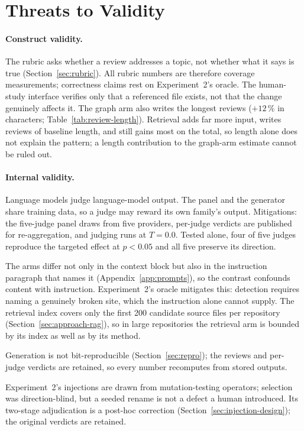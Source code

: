 \section{Threats to Validity}
\label{sec:threats}

\paragraph{Construct validity.}
The rubric asks whether a review addresses a topic, not whether what it says
is true (Section~\ref{sec:rubric}). All rubric numbers are therefore coverage
measurements; correctness claims rest on Experiment~2's oracle. The
human-study interface verifies only that a referenced file exists, not that
the change genuinely affects it. The graph arm also writes the longest
reviews ($+12\,\%$ in characters; Table~\ref{tab:review-length}).
Retrieval adds far more input, writes reviews of baseline length, and still
gains most on the total, so length alone does not explain the pattern; a
length contribution to the graph-arm estimate cannot be ruled out.

\paragraph{Internal validity.}
Language models judge language-model output. The panel and the generator share
training data, so a judge may reward its own family's output. Mitigations:
the five-judge panel draws from five providers, per-judge verdicts are
published for re-aggregation, and judging runs at $T = 0.0$. Tested alone,
four of five judges reproduce the targeted effect at $p < 0.05$ and all five
preserve its direction.

The arms differ not only in the context block but also in the instruction
paragraph that names it (Appendix~\ref{app:prompts}), so the contrast
confounds content with instruction. Experiment~2's oracle mitigates this:
detection requires naming a genuinely broken site, which the instruction
alone cannot supply. The retrieval index covers only the first 200
candidate source files per repository (Section~\ref{sec:approach-rag}), so
in large repositories the retrieval arm is bounded by its index as well as
by its method.

Generation is not bit-reproducible (Section~\ref{sec:repro}); the reviews
and per-judge verdicts are retained, so every number recomputes from stored
outputs.

Experiment~2's injections are drawn from mutation-testing operators; selection
was direction-blind, but a seeded rename is not a defect a human introduced.
Its two-stage adjudication is a post-hoc correction
(Section~\ref{sec:injection-design}); the original verdicts are retained.

